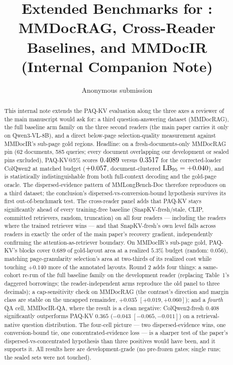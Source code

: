\documentclass[letterpaper]{article} %
\title{Extended Benchmarks for \paqc{}:\\MMDocRAG, Cross-Reader Baselines, and MMDocIR\\(Internal Companion Note)}
\author{Anonymous submission}
\newcommand{\paqc}{\textsc{PAQ-KV}}
\newcommand{\lb}{\mathrm{LB}_{95}}
\begin{document}
\maketitle

\begin{abstract}
This internal note extends the \paqc{} evaluation along the three axes a reviewer of the main manuscript would ask for: a third question-answering dataset (MMDocRAG), the full baseline arm family on the three second readers (the main paper carries it only on Qwen3-VL-8B), and a direct below-page selection-quality measurement against MMDocIR's sub-page gold regions. Headline: on a fresh-documents-only MMDocRAG pin (62 documents, 585 queries; every document overlapping our development or sealed pins excluded), \paqc{}@5\% scores $0.4089$ versus $0.3517$ for the corrected-loader ColQwen2 at matched budget ($+0.057$, document-clustered $\lb=\ragLB$), and is statistically indistinguishable from both full-context decoding and the gold-page oracle. The dispersed-evidence pattern of MMLongBench-Doc therefore reproduces on a third dataset; the conclusion's dispersed-vs-conversion-bound hypothesis survives its first out-of-benchmark test. The cross-reader panel adds that \paqc{} stays significantly ahead of every training-free baseline (SnapKV-fresh/stale, CLIP, committed retrievers, random, truncation) on all four readers --- including the readers where the trained retriever wins --- and that SnapKV-fresh's own level falls across readers in exactly the order of the main paper's recovery gradient, independently confirming the attention-as-retriever boundary. On MMDocIR's sub-page gold, \paqc{}'s blocks cover $0.689$ of gold-layout area at a realized $5.3\%$ budget (random: $0.056$), matching page-granularity selection's area at two-thirds of its realized cost while touching $+0.140$ more of the annotated layouts. Round 2 adds four things: a same-cohort re-run of the full baseline family on the development reader (replacing Table~1's daggered borrowings; the reader-independent arms reproduce the old panel to three decimals); a cap-sensitivity check on MMDocRAG (the contrast's direction and margin class are stable on the uncapped remainder, $+0.035$ $[+0.019,+0.060]$); and a \emph{fourth} QA cell, MMDocIR-QA, where the result is a clean negative: ColQwen2-fresh $0.408$ significantly outperforms \paqc{} $0.365$ ($-0.043$ $[-0.065,-0.011]$) on a retrieval-native question distribution. The four-cell picture --- two dispersed-evidence wins, one conversion-bound tie, one concentrated-evidence loss --- is a sharper test of the paper's dispersed-vs-concentrated hypothesis than three positives would have been, and it supports it. All results here are development-grade (no pre-frozen gates; single runs; the sealed sets were not touched).
\end{abstract}
\end{document}
